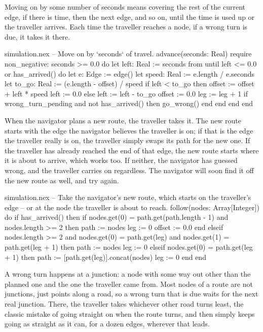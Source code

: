 Moving on by some number of seconds means covering the rest of the current
edge, if there is time, then the next edge, and so on, until the time is
used up or the traveller arrives. Each time the traveller reaches a node,
if a wrong turn is due, it takes it there.

\begin{continued}{simulation.nex}
  -- Move on by `seconds` of travel.
  advance(seconds: Real)
  require
    non_negative: seconds >= 0.0
  do
    let left: Real := seconds
    from
    until
      left <= 0.0 or has_arrived()
    do
      let e: Edge := edge()
      let speed: Real := e.length / e.seconds
      let to_go: Real := (e.length - offset) / speed
      if left < to_go then
        offset := offset + left * speed
        left := 0.0
      else
        left := left - to_go
        offset := 0.0
        leg := leg + 1
        if wrong_turn_pending and not has_arrived() then
          go_wrong()
        end
      end
    end
  end
\end{continued}

When the navigator plans a new route, the traveller takes it. The new route
starts with the edge the navigator believes the traveller is on; if that is
the edge the traveller really is on, the traveller simply swaps its path
for the new one. If the traveller has already reached the end of that edge,
the new route starts where it is about to arrive, which works too. If
neither, the navigator has guessed wrong, and the traveller carries on
regardless. The navigator will soon find it off the new route as well, and
try again.

\begin{continued}{simulation.nex}
  -- Take the navigator's new route, which starts on the traveller's edge
  -- or at the node the traveller is about to reach.
  follow(nodes: Array[Integer]) do
    if has_arrived() then
      if nodes.get(0) = path.get(path.length - 1) and nodes.length >= 2 then
        path := nodes
        leg := 0
        offset := 0.0
      end
    elseif nodes.length >= 2 and nodes.get(0) = path.get(leg)
        and nodes.get(1) = path.get(leg + 1) then
      path := nodes
      leg := 0
    elseif nodes.get(0) = path.get(leg + 1) then
      path := [path.get(leg)].concat(nodes)
      leg := 0
    end
  end
\end{continued}

A wrong turn happens at a junction: a node with some way out other than
the planned one and the one the traveller came from. Most nodes of a route
are not junctions, just points along a road, so a wrong turn that is due
waits for the next real junction. There, the traveller takes whichever
other road turns least, the classic mistake of going straight on when the
route turns, and then simply keeps going as straight as it can, for a
dozen edges, wherever that leads.

